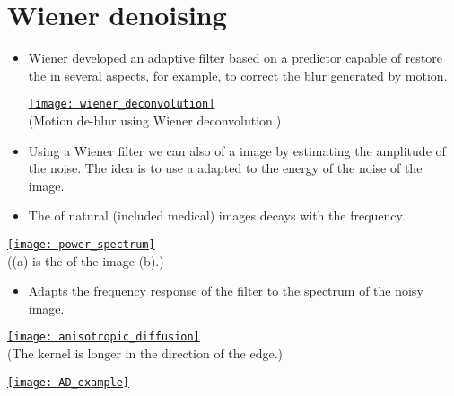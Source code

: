\section{Wiener denoising}
\begin{itemize}
\item Wiener developed an adaptive filter based on a predictor capable
  of restore the  in several
  aspects, for example,
  \href{https://docs.opencv.org/3.4/d1/dfd/tutorial_motion_deblur_filter.html}{to
    correct the blur generated by motion}.
\begin{center}
  \href{https://docs.opencv.org/3.4/white_car.jpg}{\texttt{[image: wiener\_deconvolution]}}\\
  (Motion de-blur using Wiener deconvolution.)
\end{center}
\item Using a Wiener filter we can also    of a image by
  estimating the amplitude of the noise. The idea is to use a
  adapted to the energy of the noise  of the image.
\item The  of natural (included medical) images
  decays with the frequency.
\end{itemize}
\begin{center}
  \href{https://developer.nvidia.com/gpugems/gpugems2/part-vi-simulation-and-numerical-algorithms/chapter-48-medical-image-reconstruction}{\texttt{[image: power\_spectrum]}}\\
  ((a) is the  of the image (b).)
\end{center}
\begin{itemize}
\item Adapts the frequency response of the filter to the spectrum of the noisy image.
\end{itemize}
\begin{center}
  \href{https://dsp.stackexchange.com/questions/14606/anisotropic-diffusion}{\texttt{[image: anisotropic\_diffusion]}}\\
  (The kernel is longer in the direction of the edge.)
\end{center}
\begin{center}
    \href{https://www.cloudfactory.com/blog/gaussian-noise-medical-ai}{\texttt{[image: AD\_example]}}
\end{center}


